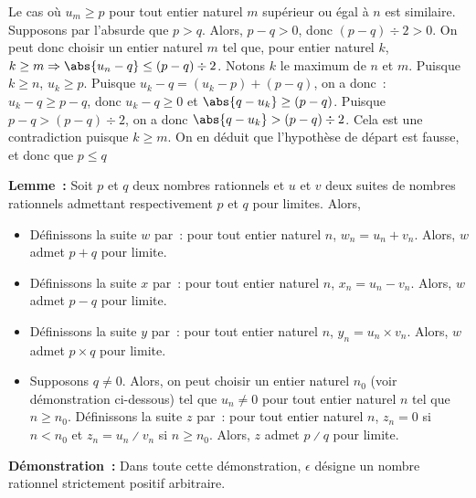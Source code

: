     Le cas où $u_m \geq p$ pour tout entier naturel $m$ supérieur ou égal à $n$ est similaire. 
    Supposons par l'absurde que $p > q$. 
    Alors, $p - q > 0$, donc $(p - q) \div 2 > 0$. 
    On peut donc choisir un entier naturel $m$ tel que, pour entier naturel $k$, $k \geq m \Rightarrow \abs{u_n - q} \leq (p - q) \div 2$.
    Notons $k$ le maximum de $n$ et $m$. 
    Puisque $k \geq n$, $u_k \geq p$. 
    Puisque $u_k - q = (u_k - p) + (p - q)$, on a donc : $u_k - q \geq p - q$, donc $u_k - q \geq 0$ et $\abs{q - u_k} \geq (p - q)$.
    Puisque $p - q > (p - q) \div 2$, on a donc $\abs{q - u_k} > (p - q) \div 2$.
    Cela est une contradiction puisque $k \geq m$.
    On en déduit que l'hypothèse de départ est fausse, et donc que $p \leq q$

    \done

\medskip

\noindent\textbf{Lemme :} Soit $p$ et $q$ deux nombres rationnels et $u$ et $v$ deux suites de nombres rationnels admettant respectivement $p$ et $q$ pour limites. 
    Alors, 
    \begin{itemize}[nosep]
        \item Définissons la suite $w$ par : pour tout entier naturel $n$, $w_n = u_n + v_n$. 
            Alors, $w$ admet $p + q$ pour limite.
        \item Définissons la suite $x$ par : pour tout entier naturel $n$, $x_n = u_n - v_n$. 
            Alors, $w$ admet $p - q$ pour limite.
        \item Définissons la suite $y$ par : pour tout entier naturel $n$, $y_n = u_n \times v_n$. 
            Alors, $w$ admet $p \times q$ pour limite.
        \item Supposons $q \neq 0$. 
            Alors, on peut choisir un entier naturel $n_0$ (voir démonstration ci-dessous) tel que $u_n \neq 0$ pour tout entier naturel $n$ tel que $n \geq n_0$.
            Définissons la suite $z$ par : pour tout entier naturel $n$, $z_n = 0$ si $n < n_0$ et $z_n = u_n \divslash v_n$ si $n \geq n_0$.
            Alors, $z$ admet $p \divslash q$ pour limite.
    \end{itemize}

\medskip

\noindent\textbf{Démonstration :}
    Dans toute cette démonstration, $\epsilon$ désigne un nombre rationnel strictement positif arbitraire.

